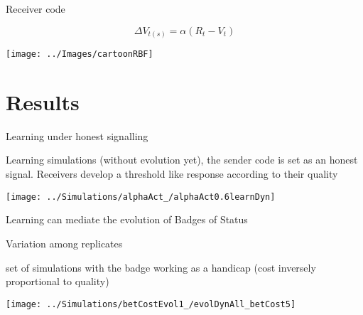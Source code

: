 \documentclass[
  ignorenonframetext,
]{beamer}
\begin{document}
\begin{frame}{Receiver code}
\protect\hypertarget{receiver-code}{}

\begin{equation*}
  \Delta V_{t(s)}=\alpha (R_t-V_t)
\end{equation*}

\begin{center}\texttt{[image: ../Images/cartoonRBF]} \end{center}

\end{frame}

\hypertarget{results}{%
\section{Results}\label{results}}

\begin{frame}{Learning under honest signalling}
\protect\hypertarget{learning-under-honest-signalling}{}

Learning simulations (without evolution yet), the sender code is set as
an honest signal. Receivers develop a threshold like response according
to their quality

\begin{center}\texttt{[image: ../Simulations/alphaAct\_/alphaAct0.6learnDyn]} \end{center}

\end{frame}

\begin{frame}{Learning can mediate the evolution of Badges of Status}
\protect\hypertarget{learning-can-mediate-the-evolution-of-badges-of-status}{}

\begin{block}{Variation among replicates}

\small

set of simulations with the badge working as a handicap (cost inversely
proportional to quality)

\begin{center}\texttt{[image: ../Simulations/betCostEvol1\_/evolDynAll\_betCost5]} \end{center}

\end{block}

\end{frame}
\end{document}
